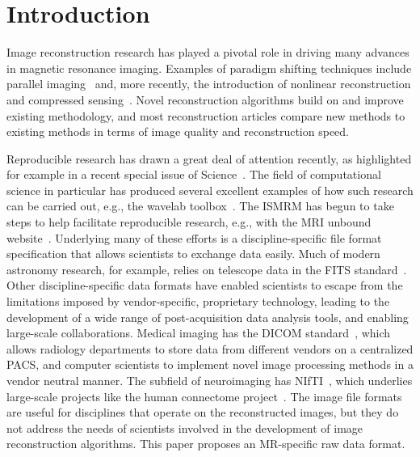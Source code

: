 \documentclass[12pt, draft]{article}
\begin{document}
\newpage
\clearpage
\onecolumn

\section*{Introduction}
Image reconstruction research has played a pivotal role in driving many advances in magnetic resonance imaging. Examples of paradigm shifting techniques include parallel imaging~\cite{Pruessmann:1999uq, Sodickson:1997fk, Griswold:2002kx}  and, more recently, the introduction of nonlinear reconstruction and compressed sensing~\cite{Donoho:2006compressed, Lustig:2007vn}. Novel reconstruction algorithms build on and improve existing methodology, and most reconstruction articles compare new methods to existing methods in terms of image quality and reconstruction speed.

Reproducible research has drawn a great deal of attention recently, as highlighted for example in a recent special issue of Science~\cite{Jasny:2011again, Peng:2011reproducible}. The field of computational science in particular has produced several excellent examples of how such research can be carried out, e.g., the wavelab toolbox~\cite{wavelab}.  The ISMRM has begun to take steps to help facilitate reproducible research, e.g., with the MRI unbound website~\cite{mri_unbound}. Underlying many of these efforts is a discipline-specific file format specification that allows scientists to exchange data easily.  Much of modern astronomy research, for example, relies on telescope data in the FITS standard~\cite{fits}.  Other discipline-specific data formats have enabled scientists to escape from the limitations imposed by vendor-specific, proprietary technology, leading to the development of a wide range of post-acquisition data analysis tools, and enabling large-scale collaborations.  Medical imaging has the DICOM standard~\cite{dicom}, which allows radiology departments to store data from different vendors on a centralized PACS, and computer scientists to implement novel image processing methods in a vendor neutral manner. The subfield of neuroimaging has NIfTI~\cite{nifti}, which underlies large-scale projects like the human connectome project~\cite{connectome}. The image file formats are useful for disciplines that operate on the reconstructed images, but they do not address the needs of scientists involved in the development of image reconstruction algorithms. This paper proposes an MR-specific raw data format.
\end{document}
